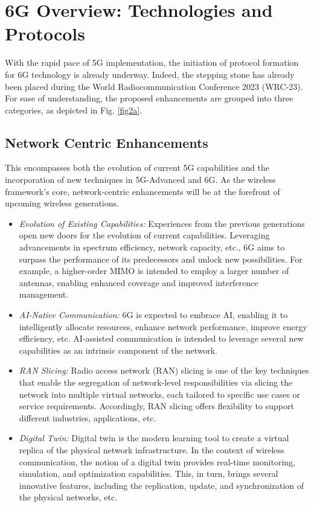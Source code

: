 \documentclass[journal, comsoc]{IEEEtran}
\begin{document}
\section{6G Overview: Technologies and Protocols}
\label{sec:2}
With the rapid pace of 5G implementation, the initiation of protocol formation for 6G technology is already underway. Indeed, the stepping stone has already been placed during the World Radiocommunication Conference 2023 (WRC-23). For ease of understanding, the proposed enhancements are grouped into three categories, as depicted in Fig. \ref{fig2a}.




\subsection{Network Centric Enhancements}
This encompasses both the evolution of current 5G capabilities and the incorporation of new techniques in 5G-Advanced and 6G. As the wireless framework's core, network-centric enhancements will be at the forefront of upcoming wireless generations. 

\begin{itemize}
    \item \emph{Evolution of Existing Capabilities:}  Experiences from the previous generations open new doors for the evolution of current capabilities. Leveraging advancements in spectrum efficiency, network capacity, etc., 6G aims to surpass the performance of its predecessors and unlock new possibilities. For example, a higher-order MIMO is intended to employ a larger number of antennas, enabling enhanced coverage and improved interference management. 

\item \textit{AI-Native Communication:} 6G is expected to embrace AI, enabling it to intelligently allocate resources, enhance network performance, improve energy efficiency, etc. AI-assisted communication is intended to leverage several new capabilities as an intrinsic component of the network. 

\item \textit{RAN Slicing:} Radio access network (RAN) slicing is one of the key techniques that enable the segregation of network-level responsibilities via slicing the network into multiple virtual networks, each tailored to specific use cases or service requirements. Accordingly, RAN slicing offers flexibility to support different industries, applications, etc. 

\item \textit{Digital Twin:} Digital twin is the modern learning tool to create a virtual replica of the physical network infrastructure. In the context of wireless communication, the notion of a digital twin provides real-time monitoring, simulation, and optimization capabilities. This, in turn, brings several innovative features, including the replication, update, and synchronization of the physical networks, etc.
\end{itemize}
\end{document}
